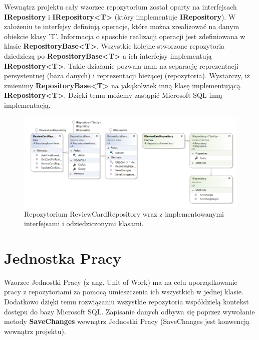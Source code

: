 Wewnątrz projektu cały wzorzec repozytorium został oparty na interfejsach \textbf{IRepository} i \textbf{IRepository<T>} (który implementuje \textbf{IRepository}). W założeniu te interfejsy definiują operacje, które można zrealizować na danym obiekcie klasy 'T'. Informacja o sposobie realizacji operacji jest zdefiniowana w klasie \textbf{RepositoryBase<T>}.
Wszystkie kolejne stworzone repozytoria dziedziczą po \textbf{RepositoryBase<T>} a ich interfejsy implementują \textbf{IRepository<T>}. 
Takie działanie pozwala nam na separację reprezentacji persystentnej (baza danych) i reprezentacji bieżącej (repozytoria). Wystarczy, iż zmienimy \textbf{RepositoryBase<T>} na jakąkolwiek inną klasę implementującą \textbf{IRepository<T>}. Dzięki temu możemy zastąpić Microsoft SQL inną implementacją.


\begin{figure}[h]
	\centering
	\includegraphics[width=\textwidth]{images/ReviewRepository.png}
	 \caption{Repozytorium ReviewCardRepository wraz z implementowanymi interfejsami i odziedziczonymi klasami.}
\end{figure}

\section{Jednostka Pracy}

Wzorzec Jednostki Pracy (z ang. Unit of Work)\cite{RepositoryUnitOfWorkPattern} ma na celu uporządkowanie pracy z repozytoriami za pomocą umieszczenia ich wszystkich w jednej klasie. Dodatkowo dzięki temu rozwiązaniu wszystkie repozytoria współdzielą kontekst dostępu do bazy Microsoft SQL. Zapisanie danych odbywa się poprzez wywołanie metody \textbf{SaveChanges} wewnątrz Jednostki Pracy (SaveChanges jest konwencją wewnątrz projektu).

